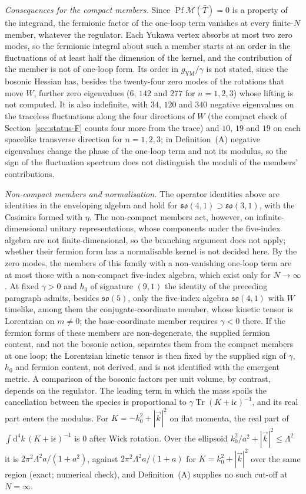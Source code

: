 \emph{Consequences for the compact members.} Since \(\operatorname{Pf}\mathcal M(\bar T)=0\) is a property of the integrand, the fermionic factor of the one-loop term vanishes at every finite-\(N\) member, whatever the regulator. Each Yukawa vertex absorbs at most two zero modes, so the fermionic integral about such a member starts at an order in the fluctuations of at least half the dimension of the kernel, and the contribution of the member is not of one-loop form. Its order in \(g_{\mathrm{YM}}/\gamma\) is not stated, since the bosonic Hessian has, besides the twenty-four zero modes of the rotations that move \(W\), further zero eigenvalues (\(6\), \(142\) and \(277\) for \(n=1,2,3\)) whose lifting is not computed. It is also indefinite, with \(34\), \(120\) and \(340\) negative eigenvalues on the traceless fluctuations along the four directions of \(W\) (the compact check of Section~\ref{sec:status-F} counts four more from the trace) and \(10\), \(19\) and \(19\) on each spacelike transverse direction for \(n=1,2,3\); in Definition~(A) negative eigenvalues change the phase of the one-loop term and not its modulus, so the sign of the fluctuation spectrum does not distinguish the moduli of the members' contributions.

\emph{Non-compact members and normalisation.} The operator identities above are identities in the enveloping algebra and hold for \(\mathfrak{so}(4,1)\supset\mathfrak{so}(3,1)\), with the Casimirs formed with \(\eta\). The non-compact members act, however, on infinite-dimensional unitary representations, whose components under the five-index algebra are not finite-dimensional, so the branching argument does not apply; whether their fermion form has a normalisable kernel is not decided here. By the zero modes, the members of this family with a non-vanishing one-loop term are at most those with a non-compact five-index algebra, which exist only for \(N\to\infty\). At fixed \(\gamma>0\) and \(h_0\) of signature \((9,1)\) the identity of the preceding paragraph admits, besides \(\mathfrak{so}(5)\), only the five-index algebra \(\mathfrak{so}(4,1)\) with \(W\) timelike, among them the conjugate-coordinate member, whose kinetic tensor is Lorentzian on \(m\neq0\); the base-coordinate member requires \(\gamma<0\) there. If the fermion forms of these members are non-degenerate, the supplied fermion content, and not the bosonic action, separates them from the compact members at one loop; the Lorentzian kinetic tensor is then fixed by the supplied sign of \(\gamma\), \(h_0\) and fermion content, not derived, and is not identified with the emergent metric. A comparison of the bosonic factors per unit volume, by contrast, depends on the regulator. The leading term in which the mass spoils the cancellation between the species is proportional to \(\gamma\operatorname{Tr}(K+\mathrm i\epsilon)^{-1}\), and its real part enters the modulus. For \(K=-k_0^2+|\vec k|^2\) on flat momenta, the real part of \(\int\mathrm d^4k\,(K+\mathrm i\epsilon)^{-1}\) is \(0\) after Wick rotation. Over the ellipsoid \(k_0^2/a^2+|\vec k|^2\le\Lambda^2\) it is \(2\pi^2\Lambda^2a/(1+a^2)\), against \(2\pi^2\Lambda^2a/(1+a)\) for \(K=k_0^2+|\vec k|^2\) over the same region (exact; numerical check), and Definition~(A) supplies no such cut-off at \(N=\infty\).

